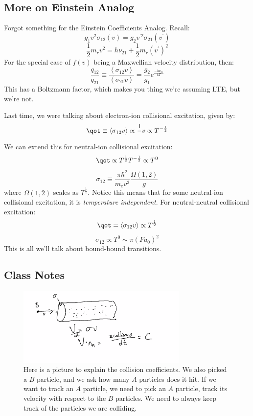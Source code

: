\documentclass{article}
\def\sigot{\sigma_{12}}
\def\inv#1{\frac1{#1}}
\def\hf{\frac12}
\def\inv#1{{\frac{1}{}#1}}
\def\mean#1{\left\langle {#1}\right\rangle}
\def\sigot{\sigma_{12}}
\def\hf{\frac12}
\begin{document}
\subsection{ More on Einstein Analog }
Forgot something for the Einstein Coefficients Analog.  Recall:
$$g_1v^2\sigma_{12}(v)=g_2v^{\prime2}\sigma_{21}(v^\prime)$$
$$\hf m_rv^2=h\nu_{21}+\hf m_r(v^\prime)^2$$
For the special case of $f(v)$ being a Maxwellian velocity distribution, then:
$$\frac{q_{12}}{q_{21}}\equiv\frac{\mean{\sigma_{12}v}}{\mean{\sigma_{21}v}}
=\frac{g_2}{g_1}e^\frac{-h\nu_{21}}{kT}$$
This has a Boltzmann factor, which makes you thing we're assuming LTE, but
we're not. \par
Last time, we were talking about electron-ion collisional excitation, given by:
$$\qot\equiv\mean{\sigot v}\propto\inv{v}\propto T^{-\hf}$$
We can extend this for neutral-ion collisional excitation:
$$\qot \propto T^\hf T^{-\hf} \propto T^0$$
$$\sigot\equiv\frac{\pi\hbar^2}{ m_ev^2}\frac{\Omega(1,2)}{ g}$$
where $\Omega(1,2)$ scales as $T^\hf$.  Notice this means that for some
neutral-ion collisional excitation, it is {\it temperature independent}.
For neutral-neutral collisional excitation:
$$\qot=\mean{\sigot v}\propto T^\hf$$
$$\sigot\propto T^0\sim \pi(Fa_0)^2$$
This is all we'll talk about bound-bound transitions.


\subsection{Class Notes}

\begin{figure}
    \centering
    \includegraphics[width=0.75\textwidth]{figures/Screen Shot 2020-10-08 at 11.20.59 AM.png}
    \caption{Here is a picture to explain the collision coefficients. We also picked a $B$ particle, and we ask how many $A$ particles does it hit. If we want to track an $A$ particle, we need to pick an $A$ particle, track its velocity with respect to the $B$ particles. We need to always keep track of the particles we are colliding.}
    \label{fig:coeffs}
\end{figure}
\end{document}

